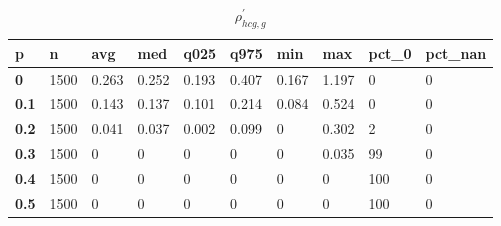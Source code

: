 \begin{table}[h]
 \centering 
\footnotesize
\caption{$\rho_{hcg,g}^\prime $}
\label{tab:alphahcgg}
\begin{tabular}[h]{|l|l|l|l|l|l|l|l|l|l|
    } \hline
\textbf{ p} & \textbf{ n} & \textbf{ avg} & \textbf{ med} & \textbf{ q025} & \textbf{ q975} & \textbf{ min} & \textbf{ max} & \textbf{ pct\_0} & \textbf{ pct\_nan}
    \\ \hline
  \textbf{  0} & 1500 & 0.263 & 0.252 & 0.193 & 0.407 & 0.167 & 1.197 &   0 & 0
    \\ \hline
  \textbf{0.1} & 1500 & 0.143 & 0.137 & 0.101 & 0.214 & 0.084 & 0.524 &   0 & 0
    \\ \hline
  \textbf{0.2} & 1500 & 0.041 & 0.037 & 0.002 & 0.099 &     0 & 0.302 &   2 & 0
    \\ \hline
  \textbf{0.3} & 1500 &     0 &     0 &     0 &     0 &     0 & 0.035 &  99 & 0
    \\ \hline
  \textbf{0.4} & 1500 &     0 &     0 &     0 &     0 &     0 &     0 & 100 & 0
    \\ \hline
  \textbf{0.5} & 1500 &     0 &     0 &     0 &     0 &     0 &     0 & 100 & 0
    \\ \hline
 \end{tabular}
 \end{table}
